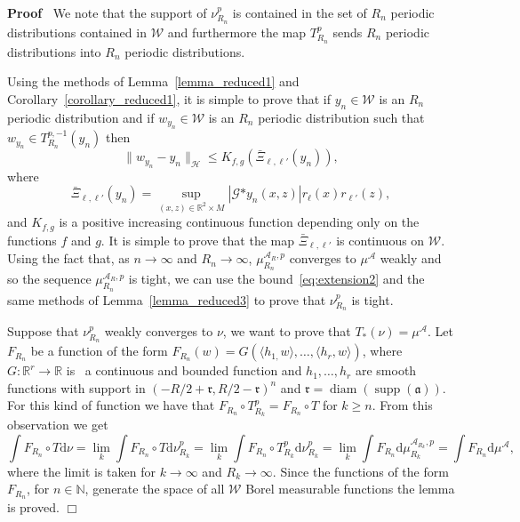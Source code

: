 \documentclass[a4paper,10pt]{article}
\newcommand{\asterisk}{\mathord{*}}
\newcommand{\mathd}{\mathrm{d}}
\newcommand{\tmop}[1]{\ensuremath{\operatorname{#1}}}
\newenvironment{proof}{\noindent\textbf{Proof\ }}{\hspace*{\fill}$\Box$\medskip}
\begin{document}
\begin{proof}
  We note that the support of $\nu_{R_n}^p$ is contained in the set of $R_n$
  periodic distributions contained in $\mathcal{W}$ and furthermore the map
  $T_{R_n}^p$ sends $R_n$ periodic distributions into $R_n$ periodic
  distributions.
  
  Using the methods of Lemma~\ref{lemma_reduced1} and
  Corollary~\ref{corollary_reduced1}, it is simple to prove that if $y_n \in
  \mathcal{W}$ is an $R_n$ periodic distribution and if $w_{y_n} \in
  \mathcal{W}$ is an $R_n$ periodic distribution such that $w_{y_n} \in T^{p,
  - 1}_{R_n} (y_n)$ then
  \begin{equation}
    \| w_{y_n} - y_n \|_{\mathcal{H}} \leqslant K_{f, g} (\bar{\Xi}_{\ell,
    \ell'} (y_n)), \label{eq:extension2}
  \end{equation}
  where
  \[ \bar{\Xi}_{\ell, \ell'} (y_n) = \sup_{(x, z) \in \mathbb{R}^2 \times M}
     | \mathcal{G} \asterisk y_n (x, z) | r_{\ell} (x) r_{\ell'} (z), \]
  and $K_{f, g}$ is a positive increasing continuous function depending only
  on the functions $f$ and $g$. It is simple to prove that the map
  $\bar{\Xi}_{\ell, \ell'}$ is continuous on $\mathcal{W}$. Using the fact
  that, as $n \rightarrow \infty$ and $R_n \rightarrow \infty$,
  $\mu^{\mathcal{A}_R, p}_{R_n}$ converges to $\mu^{\mathcal{A}}$ weakly and
  so the sequence $\mu^{\mathcal{A}_R, p}_{R_n}$ is tight, we can use the
  bound~{\eqref{eq:extension2}} and the same methods of
  Lemma~\ref{lemma_reduced3} to prove that $\nu_{R_n}^p$ is tight.
  
  Suppose that $\nu_{R_n}^p$ weakly converges to $\nu$, we want to prove that
  $T_{\asterisk} (\nu) = \mu^{\mathcal{A}}$. Let $F_{R_n}$ be a function of
  the form $F_{R_n} (w) = G (\langle h_{1,} w \rangle, \ldots, \langle h_r,
  w \rangle)$, where $G : \mathbb{R}^r \rightarrow \mathbb{R}$ is \ a
  continuous and bounded function and $h_1, \ldots, h_r$ are smooth functions
  with support in $(- R / 2 + \mathfrak{r}, R / 2 - \mathfrak{r})^n$ and
  $\mathfrak{r} = \tmop{diam} (\tmop{supp} (\mathfrak{a}))$. For this kind of
  function we have that $F_{R_n} \circ T_{R_k}^p = F_{R_n} \circ T$ for $k
  \geqslant n$. From this observation we get
  \[ \int F_{R_n} \circ T \mathd \nu = \lim_k \int F_{R_n} \circ T \mathd
     \nu_{R_k}^p = \lim_k \int F_{R_n} \circ T_{R_k}^p \mathd \nu_{R_k}^p =
     \lim_k \int F_{R_n} \mathd \mu^{\mathcal{A}_{R_k}, p}_{R_k} = \int
     F_{R_n} \mathd \mu^{\mathcal{A}}, \]
  where the limit is taken for $k \rightarrow \infty$ and $R_k \rightarrow
  \infty$. Since the functions of the form $F_{R_n}$, for $n \in \mathbb{N}$,
  generate the space of all $\mathcal{W}$ Borel measurable functions the lemma
  is proved.
\end{proof}
\end{document}
